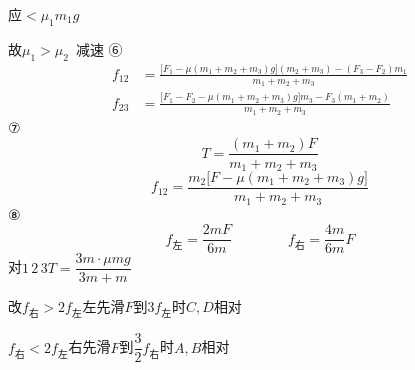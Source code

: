 应$<\mu_1m_1g$

故$\mu_1>\mu_2$\ 减速
⑥
\begin{align*}
f_{12}&=\frac{\bigl[F_1-\mu(m_1+m_2+m_3)g\bigr](m_2+m_3)-(F_3-F_2)m_1}{m_1+m_2+m_3}\\[8pt]
f_{23}&=\frac{\bigl[F_1-F_2-\mu(m_1+m_2+m_3)g\bigr]m_3-F_3(m_1+m_2)}{m_1+m_2+m_3}
\end{align*}
⑦ %
\[
T=\frac{(m_1+m_2)F}{m_1+m_2+m_3}
\]
\[
f_{12}=\frac{m_2\bigl[F-\mu(m_1+m_2+m_3)g\bigr]}{m_1+m_2+m_3}
\]
⑧
\[
f_{\text{左}}=\frac{2mF}{6m}\qquad\qquad f_{\text{右}}=\frac{4m}{6m}F
\]
对$1\,2\,3$\quad $T=\dfrac{3m\cdot\mu mg}{3m+m}$

改\quad $f_{\text{右}}>2f_{\text{左}}$\quad 左先滑\quad $F$到$3f_{\text{左}}$时\quad $C,D$相对 %

$f_{\text{右}}<2f_{\text{左}}$\quad 右先滑\quad $F$到$\dfrac32f_{\text{右}}$时\quad $A,B$相对 %

